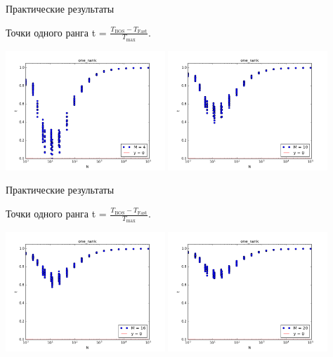 \documentclass{beamer}
\begin{document}
\begin{frame}{Практические результаты}
\begin{block}{Точки одного ранга}
t = $\frac{T_\text{BOS} - T_\text{Fast}}{T_\text{max}}$.
\begin{table}[h]
\begin{center}
\includegraphics[width=6cm]{pic/one_rank_m=4}
\includegraphics[width=6cm]{pic/one_rank_m=10}
\end{center}
\end{table}
\end{block}
\end{frame}

\begin{frame}{Практические результаты}
\begin{block}{Точки одного ранга}
t = $\frac{T_\text{BOS} - T_\text{Fast}}{T_\text{max}}$.
\begin{table}[h]
\begin{center}
\includegraphics[width=6cm]{pic/one_rank_m=16}
\includegraphics[width=6cm]{pic/one_rank_m=20}
\end{center}
\end{table}
\end{block}
\end{frame}
\end{document}
